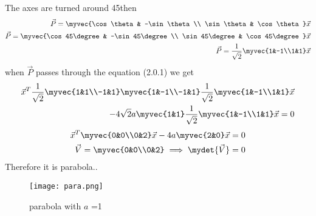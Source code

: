 The axes are turned around 45\degree then 
\begin{align}
    \vec{P}=\myvec{\cos\theta & -\sin\theta \\ \sin\theta & \cos\theta}\vec{x}\\
    \vec{P}=\myvec{\cos45\degree & -\sin45\degree \\ \sin45\degree & \cos45\degree}\vec{x}\\
    \vec{P} = \frac{1}{\sqrt{2}}\myvec{1&-1\\1&1}\vec{x}
\end{align}
when $\vec{P}$ passes through the equation (2.0.1) we get
\begin{multline}
\begin{aligned}
\vec{x}^T\frac{1}{\sqrt{2}}\myvec{1&1\\-1&1}\myvec{1&-1\\-1&1}\frac{1}{\sqrt{2}}\myvec{1&-1\\1&1}\vec{x}\\-4\sqrt{2}a\myvec{1&1}\frac{1}{\sqrt{2}}\myvec{1&-1\\1&1}\vec{x}=0
\end{aligned}
\end{multline}
\begin{align}
    \vec{x}^T\myvec{0&0\\0&2}\vec{x}-4a\myvec{2&0}\vec{x}=0\\
    \vec{V}=\myvec{0&0\\0&2}\implies\mydet{\vec{V}}=0
\end{align}
Therefore it is parabola..
\begin{figure}[!ht]
\centering
\texttt{[image: para.png]}
\caption{ parabola with $a$ =1}
\label{Fig}
\end{figure}

